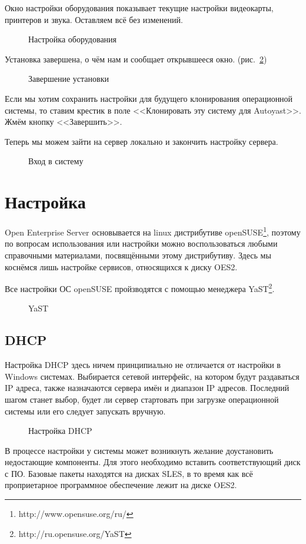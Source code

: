 Окно настройки оборудования показывает текущие настройки видеокарты, принтеров и звука. Оставляем всё без изменений.
\begin{figure}[H]
\caption{Настройка оборудования}
\label{fig14}
\end{figure}
\clearpage

Установка завершена, о чём нам и сообщает открывшееся окно. (рис.~\ref{fig15})
\begin{figure}[H]
\caption{Завершение установки}
\label{fig15}
\end{figure}
Если мы хотим сохранить настройки для будущего клонирования операционной
системы, то ставим крестик в поле <<Клонировать эту систему для Autoyast>>. Жмём кнопку <<Завершить>>.
\clearpage

Теперь мы можем зайти на сервер локально и закончить настройку сервера.
\begin{figure}[H]
\caption{Вход в систему}
\label{fig16}
\end{figure}
\clearpage

\section{Настройка}
Open Enterprise Server основывается на linux дистрибутиве openSUSE\footnote{http://www.opensuse.org/ru/}, поэтому по вопросам использования или настройки можно воспользоваться любыми справочными материалами, посвящёнными этому дистрибутиву. Здесь мы коснёмся лишь настройке сервисов, относящихся к диску OES2.\par 
Все настройки ОС openSUSE пройзводятся с помощью менеджера YaST\footnote{http://ru.opensuse.org/YaST}.
\begin{figure}[H]
\caption{YaST}
\label{yast}
\end{figure}
\clearpage

\subsection{DHCP}
Настройка DHCP здесь ничем принципиально не отличается от настройки в Windows системах. Выбирается сетевой интерфейс, на котором будут раздаваться IP адреса, также назначаются сервера имён и диапазон IP адресов. Последний шагом станет выбор, будет ли сервер стартовать при загрузке операционной системы или его следует запускать вручную.
\begin{figure}[H]
\caption{Настройка DHCP}
\label{dhcp}
\end{figure}
В процессе настройки у системы может возникнуть желание доустановить недостающие компоненты. Для этого необходимо вставить соответствующий диск с ПО. Базовые пакеты находятся на дисках SLES, в то время как всё проприетарное программное обеспечение лежит на диске OES2.
\clearpage

